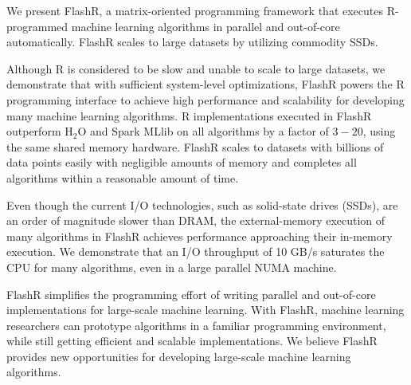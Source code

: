 We present FlashR, a matrix-oriented programming framework that executes
R-programmed machine learning algorithms in parallel and out-of-core
automatically. FlashR scales to large datasets by utilizing commodity SSDs.


Although R is considered to be slow and unable to scale to large datasets,
we demonstrate that with sufficient system-level optimizations, FlashR powers
the R programming interface to achieve high performance and scalability
for developing many machine learning algorithms. R implementations executed in FlashR
outperform H$_2$O and Spark MLlib on all algorithms by a factor of $3-20$, using
the same shared memory hardware. FlashR scales to datasets with billions of
data points easily with negligible amounts of memory and completes all
algorithms within a reasonable amount of time.

Even though the current I/O technologies, such as solid-state drives (SSDs),
are an order of magnitude slower than DRAM, the external-memory execution
of many algorithms in FlashR achieves performance approaching their in-memory
execution. We demonstrate that an I/O throughput of 10 GB/s saturates the CPU
for many algorithms, even in a large parallel NUMA machine. 

FlashR simplifies the programming effort of writing parallel and out-of-core
implementations for large-scale machine learning. With FlashR, machine learning
researchers can prototype algorithms in a familiar programming environment,
while still getting efficient and scalable implementations.
We believe FlashR provides new opportunities for developing large-scale
machine learning algorithms.

